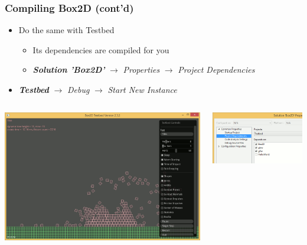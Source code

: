 \documentclass[glossy]{beamer}
\begin{document}
\begin{frame}[fragile=singleslide]
  \frametitle{Compiling Box2D (cont'd)}

  \begin{itemize}
    \item Do the same with Testbed
    \begin{itemize}
      \item Its dependencies are compiled for you
      \item \emph{\textbf{Solution 'Box2D'}} $\rightarrow$ \emph{Properties} $\rightarrow$ \emph{Project Dependencies}
    \end{itemize}
    \item \emph{\textbf{Testbed}} $\rightarrow$ \emph{Debug} $\rightarrow$ \emph{Start New Instance}
  \end{itemize}

  \begin{columns}
    \begin{column}{6cm}
      \includegraphics[width=0.9\columnwidth]{windows-05}
    \end{column}

    \begin{column}{6cm}
      \includegraphics[width=0.9\columnwidth]{windows-06}
    \end{column}
  \end{columns}
\end{frame}
\end{document}
